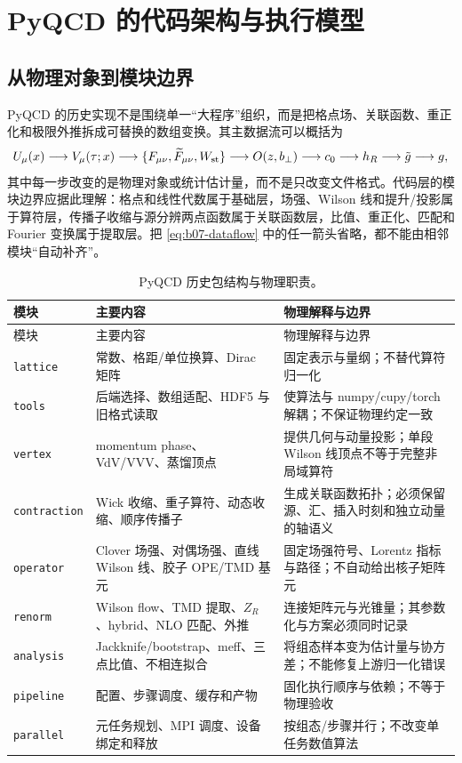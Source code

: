 \chapter{PyQCD 的代码架构与执行模型}

\section{从物理对象到模块边界}

PyQCD 的历史实现不是围绕单一“大程序”组织，而是把格点场、关联函数、重正化和极限外推拆成可替换的数组变换。其主数据流可以概括为
\begin{equation}
  U_\mu(x)
  \longrightarrow V_\mu(\tau;x)
  \longrightarrow \{F_{\mu\nu},\widetilde F_{\mu\nu},W_{\rm st}\}
  \longrightarrow O(z,b_\perp)
  \longrightarrow c_0
  \longrightarrow h_R
  \longrightarrow \tilde g
  \longrightarrow g,
  \label{eq:b07-dataflow}
\end{equation}
其中每一步改变的是物理对象或统计估计量，而不是只改变文件格式。代码层的模块边界应据此理解：格点和线性代数属于基础层，场强、Wilson 线和提升/投影属于算符层，传播子收缩与源分辨两点函数属于关联函数层，比值、重正化、匹配和 Fourier 变换属于提取层。把 \eqref{eq:b07-dataflow} 中的任一箭头省略，都不能由相邻模块“自动补齐”。

\begin{longtable}{>{\raggedright\arraybackslash}p{2.7cm}>{\raggedright\arraybackslash}p{5.3cm}>{\raggedright\arraybackslash}p{6.0cm}}
\caption{PyQCD 历史包结构与物理职责。}\label{tab:b07-architecture}\\
\toprule
模块 & 主要内容 & 物理解释与边界\\
\midrule
\endfirsthead
\toprule
模块 & 主要内容 & 物理解释与边界\\
\midrule
\endhead
\texttt{lattice} & 常数、格距/单位换算、Dirac 矩阵 & 固定表示与量纲；不替代算符归一化\\
\texttt{tools} & 后端选择、数组适配、HDF5 与旧格式读取 & 使算法与 numpy/cupy/torch 解耦；不保证物理约定一致\\
\texttt{vertex} & momentum phase、VdV/VVV、蒸馏顶点 & 提供几何与动量投影；单段 Wilson 线顶点不等于完整非局域算符\\
\texttt{contraction} & Wick 收缩、重子算符、动态收缩、顺序传播子 & 生成关联函数拓扑；必须保留源、汇、插入时刻和独立动量的轴语义\\
\texttt{operator} & Clover 场强、对偶场强、直线 Wilson 线、胶子 OPE/TMD 基元 & 固定场强符号、Lorentz 指标与路径；不自动给出核子矩阵元\\
\texttt{renorm} & Wilson flow、TMD 提取、$Z_R$、hybrid、NLO 匹配、外推 & 连接矩阵元与光锥量；其参数化与方案必须同时记录\\
\texttt{analysis} & Jackknife/bootstrap、meff、三点比值、不相连拟合 & 将组态样本变为估计量与协方差；不能修复上游归一化错误\\
\texttt{pipeline} & 配置、步骤调度、缓存和产物 & 固化执行顺序与依赖；不等于物理验收\\
\texttt{parallel} & 元任务规划、MPI 调度、设备绑定和释放 & 按组态/步骤并行；不改变单任务数值算法\\
\bottomrule
\end{longtable}


